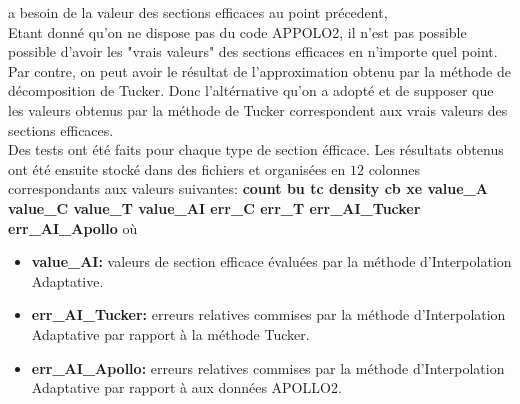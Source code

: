 a besoin de la valeur des sections efficaces au point précedent, \\
\hspace{0.5cm} Etant donné qu'on ne dispose pas du code APPOLO2, il n'est pas possible possible d'avoir les "vrais valeurs" des sections efficaces en n'importe quel point.
Par contre, on peut avoir le résultat de l'approximation obtenu par la méthode de décomposition de Tucker.
Donc l'altérnative qu'on a adopté et de supposer que les valeurs obtenus par la méthode de Tucker correspondent aux vrais valeurs des sections efficaces.\\
\hspace{0.5cm}
Des tests ont été faits pour chaque type de section éfficace. Les résultats obtenus ont été ensuite stocké dans des fichiers et organisées en $12$ colonnes correspondants aux
valeurs suivantes: \textbf{count bu tc density cb xe value\_A value\_C value\_T value\_AI err\_C err\_T err\_AI\_Tucker err\_AI\_Apollo} où
\begin{itemize}
\item \textbf{value\_AI:} valeurs de section efficace évaluées par la méthode d'Interpolation Adaptative.
\item \textbf{err\_AI\_Tucker:} erreurs relatives commises par la méthode d'Interpolation Adaptative par rapport à la méthode Tucker.
\item \textbf{err\_AI\_Apollo:} erreurs relatives commises par la méthode d'Interpolation Adaptative par rapport à aux données APOLLO2.
\end{itemize}

